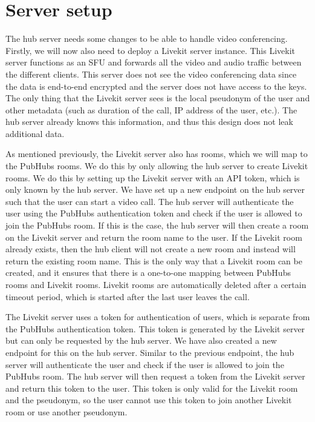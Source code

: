 \documentclass{report}
\begin{document}
\section{Server setup}\label{sec:server-setup}
The hub server needs some changes to be able to handle video conferencing. Firstly, we will now also need to deploy a
Livekit server instance. This Livekit server functions as an SFU and forwards all the video and audio traffic
between the different clients. This server does not see the video conferencing data since the data is end-to-end
encrypted and the server does not have access to the keys. The only thing that the Livekit server sees is the local
pseudonym of the user and other metadata (such as duration of the call, IP address of the user, etc.). The hub
server already knows this information, and thus this design does not leak additional data.

As mentioned previously, the Livekit server also has rooms, which we will map to the PubHubs rooms. We do this by
only allowing the hub server to create Livekit rooms. We do this by setting up the Livekit server with an API token,
which is only known by the hub server. We have set up a new endpoint on the hub server such that the user can
start a video call. The hub server will authenticate the user using the PubHubs authentication token and check if
the user is allowed to join the PubHubs room. If this is the case, the hub server will then create a room on the
Livekit server and return the room name to the user. If the Livekit room already exists, then the hub client will not
create a new room and instead will return the existing room name. This is the only way that a Livekit room can be created,
and it ensures that there is a one-to-one mapping between PubHubs rooms and Livekit rooms. Livekit rooms are automatically
deleted after a certain timeout period, which is started after the last user leaves the call.

The Livekit server uses a token for authentication of users, which is separate from the PubHubs authentication token.
This token is generated by the Livekit server but can only be requested by the hub server.
We have also created a new endpoint for this on the hub server. Similar to the previous endpoint, the hub server will
authenticate the user and check if the user is allowed to join the PubHubs room. The hub server will then request a
token from the Livekit server and return this token to the user. This token is only valid for the Livekit room and the
pseudonym, so the user cannot use this token to join another Livekit room or use another pseudonym.
\end{document}
